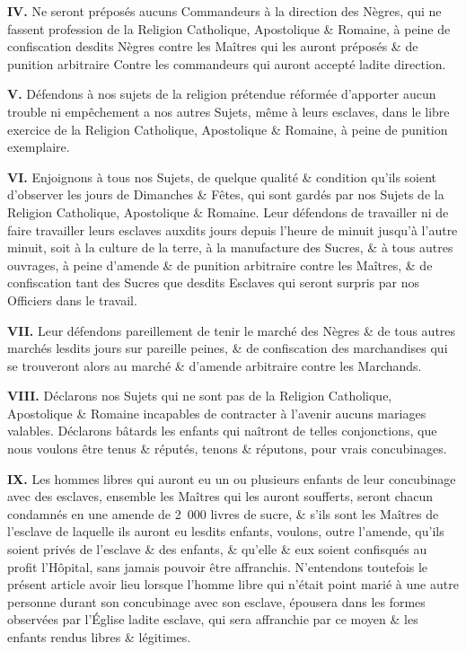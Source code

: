\documentclass[french,twoside]{book} %
\newcommand{\labelchar}[1]{\textbf{\color{rubric} #1}}
\begin{document}
\labelchar{IV.} Ne seront préposés aucuns Commandeurs à la direction des Nègres, qui ne fassent profession de la Religion Catholique, Apostolique \& Romaine, à peine de confiscation desdits Nègres contre les Maîtres qui les auront préposés \& de punition arbitraire Contre les commandeurs qui auront accepté ladite direction.\par
\labelchar{V.} Défendons à nos sujets de la religion prétendue réformée d’apporter aucun trouble ni empêchement a nos autres Sujets, même à leurs esclaves, dans le libre exercice de la Religion Catholique, Apostolique \& Romaine, à peine de punition exemplaire.\par
\labelchar{VI.} Enjoignons à tous nos Sujets, de quelque qualité \& condition qu’ils soient d’observer les jours de Dimanches \& Fêtes, qui sont gardés par nos Sujets de la Religion Catholique, Apostolique \& Romaine. Leur défendons de travailler ni de faire travailler leurs esclaves auxdits jours depuis l’heure de minuit jusqu’à l’autre minuit, soit à la culture de la terre, à la manufacture des Sucres, \& à tous autres ouvrages, à peine d’amende \& de punition arbitraire contre les Maîtres, \& de confiscation tant des Sucres que desdits Esclaves qui seront surpris par nos Officiers dans le travail.\par
\labelchar{VII.} Leur défendons pareillement de tenir le marché des Nègres \& de tous autres marchés lesdits jours sur pareille peines, \& de confiscation des marchandises qui se trouveront alors au marché \& d’amende arbitraire contre les Marchands.\par
\labelchar{VIII.} Déclarons nos Sujets qui ne sont pas de la Religion Catholique, Apostolique \& Romaine incapables de contracter à l’avenir aucuns mariages valables. Déclarons bâtards les enfants qui naîtront de telles conjonctions, que nous voulons être tenus \& réputés, tenons \& réputons, pour vrais concubinages.\par
\labelchar{IX.} Les hommes libres qui auront eu un ou plusieurs enfants de leur concubinage avec des esclaves, ensemble les Maîtres qui les auront soufferts, seront chacun condamnés en une amende de 2 000 livres de sucre, \& s’ils sont les Maîtres de l’esclave de laquelle ils auront eu lesdits enfants, voulons, outre l’amende, qu’ils soient privés de l’esclave \& des enfants, \& qu’elle \& eux soient confisqués au profit l’Hôpital, sans jamais pouvoir être affranchis. N’entendons toutefois le présent article avoir lieu lorsque l’homme libre qui n’était point marié à une autre personne durant son concubinage avec son esclave, épousera dans les formes observées par l’Église ladite esclave, qui sera affranchie par ce moyen \& les enfants rendus libres \& légitimes.\par
\end{document}
